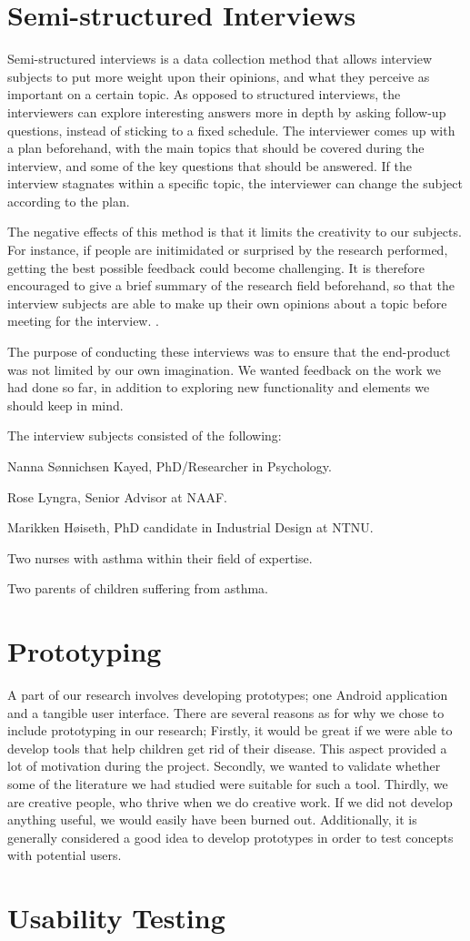 \section{Semi-structured Interviews}
\label{sec:semistructuredinterviews}

Semi-structured interviews is a data collection method that allows interview subjects to put more weight upon their opinions, and what they perceive as important on a certain topic. As opposed to structured interviews, the interviewers can explore interesting answers more in depth by asking follow-up questions, instead of sticking to a fixed schedule. The interviewer comes up with a plan beforehand, with the main topics that should be covered during the interview, and some of the key questions that should be answered. If the interview stagnates within a specific topic, the interviewer can change the subject according to the plan.

The negative effects of this method is that it limits the creativity to our subjects. For instance, if people are initimidated or surprised by the research performed, getting the best possible feedback could become challenging. It is therefore encouraged to give a brief summary of the research field beforehand, so that the interview subjects are able to make up their own opinions about a topic before meeting for the interview. \iref{}.

The purpose of conducting these interviews was to ensure that the end-product was not limited by our own imagination. We wanted feedback on the work we had done so far, in addition to exploring new functionality and elements we should keep in mind.

The interview subjects consisted of the following: 

Nanna S\o nnichsen Kayed, PhD/Researcher in Psychology.

Rose Lyngra, Senior Advisor at NAAF.

Marikken H\o iseth, PhD candidate in Industrial Design at NTNU. 

Two nurses with asthma within their field of expertise.

Two parents of children suffering from asthma.    


\section{Prototyping}
\label{sec:researchmethodprototyping}
A part of our research involves developing prototypes; one Android application and a tangible user interface. There are several reasons as for why we chose to include prototyping in our research; Firstly, it would be great if we were able to develop tools that help children get rid of their disease. This aspect provided a lot of motivation during the project. Secondly, we wanted to validate whether some of the literature we had studied were suitable for such a tool. Thirdly, we are creative people, who thrive when we do creative work. If we did not develop anything useful, we would easily have been burned out. Additionally, it is generally considered a good idea to develop prototypes in order to test concepts with potential users\iref{}.
      
\section{Usability Testing}
\label{sec:usabilitytesting}
 